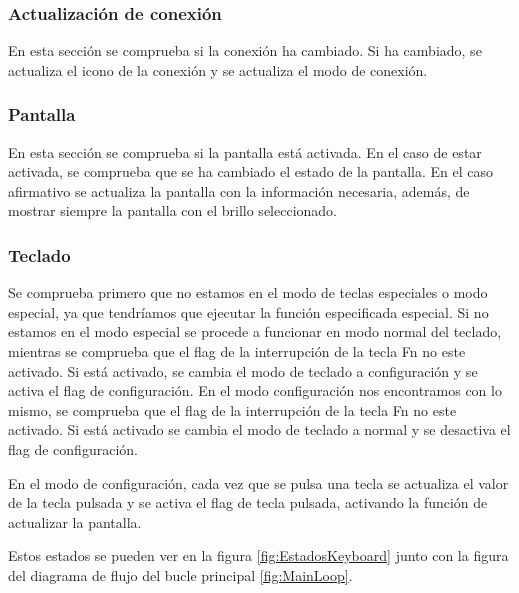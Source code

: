 \subsubsection{Actualización de conexión}
En esta sección se comprueba si la conexión ha cambiado. Si ha cambiado, se actualiza el icono de la conexión y se actualiza el modo de conexión.

\subsubsection{Pantalla}
En esta sección se comprueba si la pantalla está activada. En el caso de estar activada, se comprueba que se ha cambiado el estado de la pantalla. En el caso afirmativo se actualiza la pantalla con la información necesaria, además, de mostrar siempre la pantalla con el brillo seleccionado.

\subsubsection{Teclado}
Se comprueba primero que no estamos en el modo de teclas especiales o modo especial, ya que tendríamos que ejecutar la función especificada especial.
Si no estamos en el modo especial se procede a funcionar en modo normal del teclado, mientras se comprueba que el flag de la interrupción de la tecla Fn no este activado. Si está activado, se cambia el modo de teclado a configuración y se activa el flag de configuración.
En el modo configuración nos encontramos con lo mismo, se comprueba que el flag de la interrupción de la tecla Fn no este activado. Si está activado se cambia el modo de teclado a normal y se desactiva el flag de configuración.

En el modo de configuración, cada vez que se pulsa una tecla se actualiza el valor de la tecla pulsada y se activa el flag de tecla pulsada, activando la función de actualizar la pantalla.

Estos estados se pueden ver en la figura \ref{fig:EstadosKeyboard} junto con la figura del diagrama de flujo del bucle principal \ref{fig:MainLoop}.

